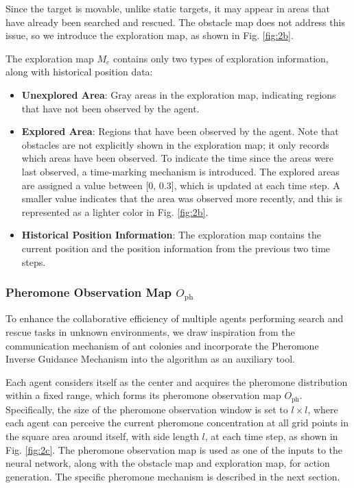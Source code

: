 \documentclass[lettersize,journal]{IEEEtran}
\begin{document}
Since the target is movable, unlike static targets, it may appear in areas that have already been searched and rescued. The obstacle map does not address this issue, so we introduce the exploration map, as shown in Fig. \ref{fig:2b}.

The exploration map \( M_e \) contains only two types of exploration information, along with historical position data:
\begin{itemize}
    \item \textbf{Unexplored Area}: Gray areas in the exploration map, indicating regions that have not been observed by the agent.
    \item \textbf{Explored Area}: Regions that have been observed by the agent. Note that obstacles are not explicitly shown in the exploration map; it only records which areas have been observed. To indicate the time since the areas were last observed, a time-marking mechanism is introduced. The explored areas are assigned a value between [0, 0.3], which is updated at each time step. A smaller value indicates that the area was observed more recently, and this is represented as a lighter color in Fig. \ref{fig:2b}.
    \item \textbf{Historical Position Information}: The exploration map contains the current position and the position information from the previous two time steps.
\end{itemize}

\subsubsection*{Pheromone Observation Map \( O_{\text{ph}} \)}

To enhance the collaborative efficiency of multiple agents performing search and rescue tasks in unknown environments, we draw inspiration from the communication mechanism of ant colonies and incorporate the Pheromone Inverse Guidance Mechanism into the algorithm as an auxiliary tool.

Each agent considers itself as the center and acquires the pheromone distribution within a fixed range, which forms its pheromone observation map \( O_{\text{ph}} \). Specifically, the size of the pheromone observation window is set to \( l \times l \), where each agent can perceive the current pheromone concentration at all grid points in the square area around itself, with side length \( l \), at each time step, as shown in Fig. \ref{fig:2c}. The pheromone observation map is used as one of the inputs to the neural network, along with the obstacle map and exploration map, for action generation. The specific pheromone mechanism is described in the next section.
\end{document}
